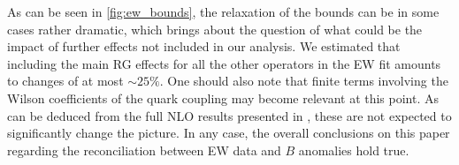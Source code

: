 As can be seen in \autoref{fig:ew_bounds}, the relaxation of the bounds can be in some cases rather dramatic, which brings about the question of what could be the impact of further effects not included in our analysis. We estimated that including the main RG effects for all the other operators in the EW fit amounts to changes of at most $\sim 25\%$. One should also note that finite terms involving the Wilson coefficients of the quark coupling may become relevant at this point. As can be deduced from the full NLO results presented in \cite{Dawson:2019clf}, these are not expected to significantly change the picture. In any case, the overall conclusions on this paper regarding the reconciliation between EW data and $B$ anomalies hold true.